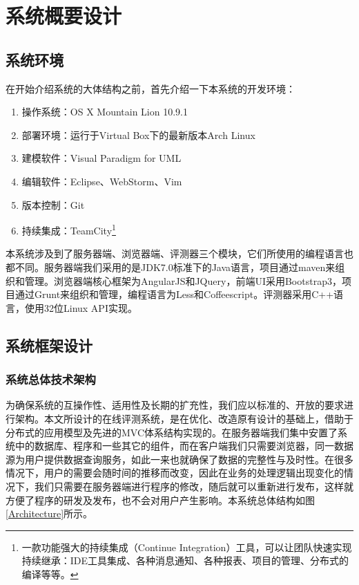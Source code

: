
\chapter{系统概要设计}
\section{系统环境}
在开始介绍系统的大体结构之前，首先介绍一下本系统的开发环境：
\begin{enumerate}
	\item 操作系统：OS X Mountain Lion 10.9.1
	\item 部署环境：运行于Virtual Box下的最新版本Arch Linux
	\item 建模软件：Visual Paradigm for UML
	\item 编辑软件：Eclipse、WebStorm、Vim
	\item 版本控制：Git
	\item 持续集成：TeamCity\footnote{一款功能强大的持续集成（Continue Integration）工具，可以让团队快速实现持续继承：IDE工具集成、各种消息通知、各种报表、项目的管理、分布式的编译等等。}
\end{enumerate}

本系统涉及到了服务器端、浏览器端、评测器三个模块，它们所使用的编程语言也都不同。服务器端我们采用的是JDK7.0标准下的Java语言，项目通过maven来组织和管理。浏览器端核心框架为AngularJS和JQuery，前端UI采用Bootstrap3，项目通过Grunt来组织和管理，编程语言为Less和Coffeescript。评测器采用C++语言，使用32位Linux API实现。

\section{系统框架设计}
\subsection{系统总体技术架构}
为确保系统的互操作性、适用性及长期的扩充性，我们应以标准的、开放的要求进行架构。本文所设计的在线评测系统，是在优化、改造原有设计的基础上，借助于分布式的应用模型及先进的MVC体系结构实现的。在服务器端我们集中安置了系统中的数据库、程序和一些其它的组件，而在客户端我们只需要浏览器，同一数据源为用户提供数据查询服务，如此一来也就确保了数据的完整性与及时性。在很多情况下，用户的需要会随时间的推移而改变，因此在业务的处理逻辑出现变化的情况下，我们只需要在服务器端进行程序的修改，随后就可以重新进行发布，这样就方便了程序的研发及发布，也不会对用户产生影响。本系统总体结构如图\ref{Architecture}所示。

